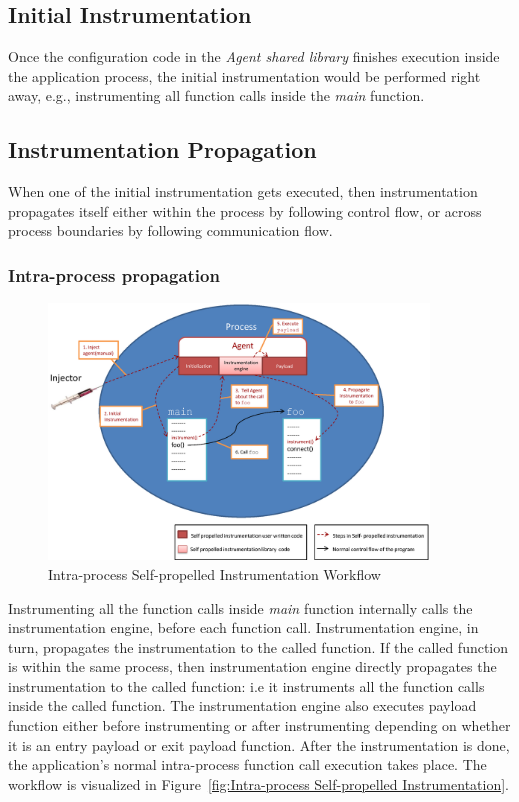 \subsection{Initial Instrumentation}
Once the configuration code in the {\em Agent shared library} finishes
execution
inside the application process, the initial instrumentation would be performed
right away, e.g., instrumenting all function calls inside the {\em main}
function.

\subsection{Instrumentation Propagation}
When one of the initial instrumentation gets executed, then instrumentation
propagates itself either within the process by following control flow,
or across
process boundaries by following communication flow.

\subsubsection{Intra-process propagation}
\begin{figure}[ht]
  \centering
  \includegraphics[width=0.90\textwidth]{figure/intraprocess.eps}
  \caption{Intra-process Self-propelled Instrumentation Workflow}
   \label{fig:Intra-process Self-propelled Instrumentation}
\end{figure}

Instrumenting all the function calls inside {\em main} function
internally calls the instrumentation engine, before each function
call. Instrumentation engine, in turn, propagates the instrumentation to
the called
function. If the called
function is within the same process, then instrumentation engine directly
propagates the instrumentation to the called function: i.e it instruments
all the function calls inside the called
function.  The instrumentation engine
also executes payload function either before instrumenting or after
instrumenting depending
on whether it is an entry payload or exit payload function. After the
instrumentation is done, the application's normal intra-process function
call execution
takes place. The workflow is visualized in Figure~\ref{fig:Intra-process
Self-propelled Instrumentation}.


